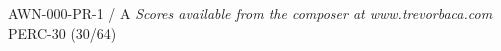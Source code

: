 \documentclass[11pt]{report}
\begin{document}
\null \vfill

AWN-000-PR-1 / A \hfill
\textit{Scores available from the composer at www.trevorbaca.com}
\hfill PERC-30 (30/64)
\end{document}

